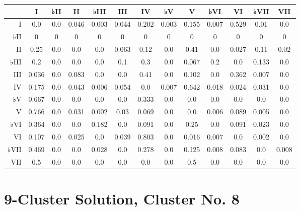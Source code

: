 \begin{table}[htbp]
\begin{minipage}{\linewidth}
\setlength{\tymax}{0.5\linewidth}
\centering
\small
\begin{tabulary}{\textwidth}{@{}RCCCCCCCCCCCC@{}} \toprule
&I&♭II&II&♭III&III&IV&♭V&V&♭VI&VI&♭VII&VII\\
\midrule
I&0.0&0.0&0.046&0.003&0.044&0.202&0.003&0.155&0.007&0.529&0.01&0.0\\
♭II&0&0&0&0&0&0&0&0&0&0&0&0\\
II&0.25&0.0&0.0&0.0&0.063&0.12&0.0&0.41&0.0&0.027&0.11&0.02\\
♭III&0.2&0.0&0.0&0.0&0.1&0.3&0.0&0.067&0.2&0.0&0.133&0.0\\
III&0.036&0.0&0.083&0.0&0.0&0.41&0.0&0.102&0.0&0.362&0.007&0.0\\
IV&0.175&0.0&0.043&0.006&0.054&0.0&0.007&0.642&0.018&0.024&0.031&0.0\\
♭V&0.667&0.0&0.0&0.0&0.0&0.333&0.0&0.0&0.0&0.0&0.0&0.0\\
V&0.766&0.0&0.031&0.002&0.03&0.069&0.0&0.0&0.006&0.089&0.005&0.0\\
♭VI&0.364&0.0&0.0&0.182&0.0&0.091&0.0&0.25&0.0&0.091&0.023&0.0\\
VI&0.107&0.0&0.025&0.0&0.039&0.803&0.0&0.016&0.007&0.0&0.002&0.0\\
♭VII&0.469&0.0&0.0&0.028&0.0&0.278&0.0&0.125&0.008&0.083&0.0&0.008\\
VII&0.5&0.0&0.0&0.0&0.0&0.0&0.0&0.5&0.0&0.0&0.0&0.0\\

\bottomrule

\end{tabulary}
\end{minipage}
\end{table}

\section{9-Cluster Solution, Cluster No. 8}
\label{9-clustersolutionclusterno.8}

